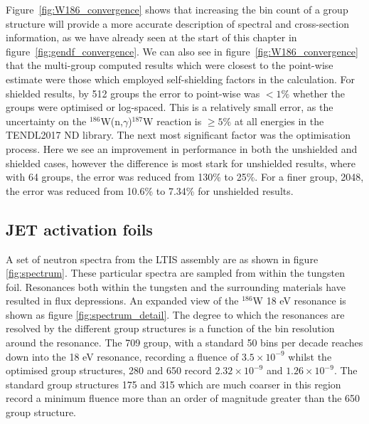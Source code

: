 Figure~\ref{fig:W186_convergence} shows that increasing the bin count of a group structure will provide a more accurate description of spectral and cross-section information, as we have already seen at the start of this chapter in figure~\ref{fig:gendf_convergence}. We can also see in figure~\ref{fig:W186_convergence} that the multi-group computed results which were closest to the point-wise estimate were those which employed self-shielding factors in the calculation. For shielded results, by 512 groups the error to point-wise was $< 1\%$ whether the groups were optimised or log-spaced. This is a relatively small error, as the uncertainty on the $^{186}$W(n,$\gamma$)$^{187}$W reaction is $\geq 5\%$ at all energies in the TENDL2017 ND library. The next most significant factor was the optimisation process. Here we see an improvement in performance in both the unshielded and shielded cases, however the difference is most stark for unshielded results, where with 64 groups, the error was reduced from 130\% to 25\%. For a finer group, 2048, the error was reduced from 10.6\% to 7.34\% for unshielded results.

\subsection{JET activation foils}
A set of neutron spectra from the LTIS assembly are as shown in figure \ref{fig:spectrum}. These particular spectra are sampled from within the tungsten foil. Resonances both within the tungsten and the surrounding materials have resulted in flux depressions. An expanded view of the $^{186}$W 18 eV resonance is shown as figure \ref{fig:spectrum_detail}. The degree to which the resonances are resolved by the different group structures is a function of the bin resolution around the resonance. The 709 group, with a standard 50 bins per decade reaches down into the 18 eV resonance, recording a fluence of $3.5\times10^{-9}$ whilst the optimised group structures, 280 and 650 record $2.32\times10^{-9}$ and $1.26\times10^{-9}$. The standard group structures 175 and 315 which are much coarser in this region record a minimum fluence more than an order of magnitude greater than the 650 group structure.

